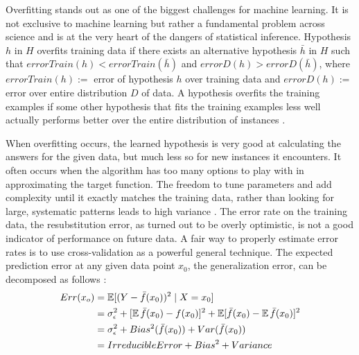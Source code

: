 Overfitting stands out as one of the biggest challenges for machine learning. It is not exclusive to machine learning but rather a fundamental problem across science and is at the very heart of the dangers of statistical inference. Hypothesis \(h\) in \(H\) overﬁts training data if there exists an alternative hypothesis \(\bar{h}\) in \(H\) such that \(errorTrain(h) < errorTrain(\bar{h})\) and \(errorD(h) > errorD(\bar{h})\), where \(errorTrain(h):=\) error of hypothesis \(h\) over training data and \(errorD(h):=\) error over entire distribution \(D\) of data. A hypothesis overfits the training examples if some other hypothesis that fits the training examples less well actually performs better over the entire distribution of instances \cite{yaser}.

When overfitting occurs, the learned hypothesis is very good at calculating the answers for the given data, but much less so for new instances it encounters. It often occurs when the algorithm has too many options to play with in approximating the target function. The freedom to tune parameters and add complexity until it exactly matches the training data, rather than looking for large, systematic patterns leads to high variance \cite{yaser}. The error rate on the training data, the resubstitution error, as turned out to be overly optimistic, is not a good indicator of performance on future data. A fair way to properly estimate error rates is to use cross-validation as a powerful general technique. The expected prediction error at any given data point \(x_0\), the generalization error, can be decomposed as follows \cite{ian}: 
\begin{align*}
Err(x_o) &= \operatorname{\mathbb{E}}[(Y - \bar{f}(x_0))^2 \mid X = x_0] \\
& =  \sigma^2_\epsilon + [\operatorname{\mathbb{E}}\bar{f}(x_0) - f(x_0)]^2 + \operatorname{\mathbb{E}}[\bar{f}(x_0) - \operatorname{\mathbb{E}}\bar{f}(x_0)]^2\\
& =  \sigma^2_\epsilon + Bias^2(\bar{f}(x_0)) + Var(\bar{f}(x_0)) \\
& = Irreducible Error + Bias^2 + Variance
\end{align*}

